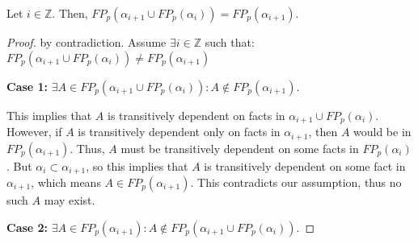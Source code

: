 \begin{lemma}
\label{lem:costmodel}
%
Let $i \in \mathbb{Z}$.  Then, $FP_p(\alpha_{i+1} \cup FP_p(\alpha_i)) =
FP_p(\alpha_{i+1})$.
%
\end{lemma}


\begin{proof}



by contradiction. Assume $\exists i \in \mathbb{Z}$ such that:
$FP_p(\alpha_{i+1} \cup FP_p(\alpha_i)) \neq FP_p(\alpha_{i+1})$

{\bf Case 1:} $\exists A \in FP_p(\alpha_{i+1} \cup FP_p(\alpha_i)) : A \not\in FP_p(\alpha_{i+1}).$

This implies that $A$ is transitively dependent on facts in $\alpha_{i+1} \cup
FP_p(\alpha_i)$.  However, if $A$ is transitively dependent only on facts in
$\alpha_{i+1}$, then $A$ would be in $FP_p(\alpha_{i+1})$.  Thus, $A$ must be
transitively dependent on some facts in $FP_p(\alpha_{i})$.  But $\alpha_{i}
\subset \alpha_{i+1}$, so this implies that $A$ is transitively dependent on
some fact in $\alpha_{i+1}$, which means $A \in FP_p(\alpha_{i+1})$.  This
contradicts our assumption, thus no such $A$ may exist.

{\bf Case 2:} $\exists A \in FP_p(\alpha_{i+1}) : A \not\in FP_p(\alpha_{i+1} \cup FP_p(\alpha_i)).$


\end{proof}
